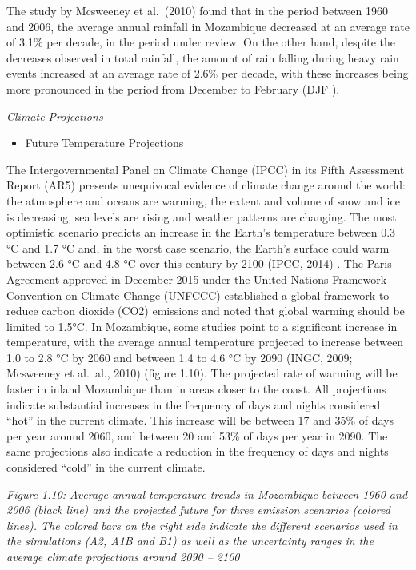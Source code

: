 \documentclass[
]{book}
\providecommand{\tightlist}{%
  \setlength{\itemsep}{0pt}\setlength{\parskip}{0pt}}
\begin{document}
The study by Mcsweeney et al.~(2010) found that in the period between 1960 and 2006, the average annual rainfall in Mozambique decreased at an average rate of 3.1\% per decade, in the period under review. On the other hand, despite the decreases observed in total rainfall, the amount of rain falling during heavy rain events increased at an average rate of 2.6\% per decade, with these increases being more pronounced in the period from December to February (DJF ).

\emph{Climate Projections}

\begin{itemize}
\tightlist
\item
  Future Temperature Projections
\end{itemize}

The Intergovernmental Panel on Climate Change (IPCC) in its Fifth Assessment Report (AR5) presents unequivocal evidence of climate change around the world: the atmosphere and oceans are warming, the extent and volume of snow and ice is decreasing, sea levels are rising and weather patterns are changing. The most optimistic scenario predicts an increase in the Earth's temperature between 0.3 °C and 1.7 °C and, in the worst case scenario, the Earth's surface could warm between 2.6 °C and 4.8 °C over this century by 2100 (IPCC, 2014) . The Paris Agreement approved in December 2015 under the United Nations Framework Convention on Climate Change (UNFCCC) established a global framework to reduce carbon dioxide (CO2) emissions and noted that global warming should be limited to 1.5°C.
In Mozambique, some studies point to a significant increase in temperature, with the average annual temperature projected to increase between 1.0 to 2.8 °C by 2060 and between 1.4 to 4.6 °C by 2090 (INGC, 2009; Mcsweeney et al.~al., 2010) (figure 1.10). The projected rate of warming will be faster in inland Mozambique than in areas closer to the coast. All projections indicate substantial increases in the frequency of days and nights considered ``hot'' in the current climate. This increase will be between 17 and 35\% of days per year around 2060, and between 20 and 53\% of days per year in 2090. The same projections also indicate a reduction in the frequency of days and nights considered ``cold'' in the current climate.

\emph{Figure 1.10: Average annual temperature trends in Mozambique between 1960 and 2006 (black line) and the projected future for three emission scenarios (colored lines). The colored bars on the right side indicate the different scenarios used in the simulations (A2, A1B and B1) as well as the uncertainty ranges in the average climate projections around 2090 -- 2100}
\end{document}

